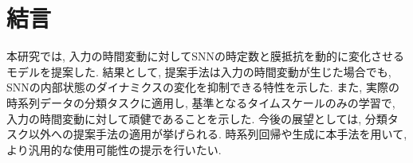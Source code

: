 \section{結言}

本研究では, 入力の時間変動に対してSNNの時定数と膜抵抗を動的に変化させるモデルを提案した.
結果として, 提案手法は入力の時間変動が生じた場合でも, SNNの内部状態のダイナミクスの変化を抑制できる特性を示した.
また, 実際の時系列データの分類タスクに適用し, 基準となるタイムスケールのみの学習で, 入力の時間変動に対して頑健であることを示した.
今後の展望としては, 分類タスク以外への提案手法の適用が挙げられる.
時系列回帰や生成に本手法を用いて, より汎用的な使用可能性の提示を行いたい.
% 
% 
% 